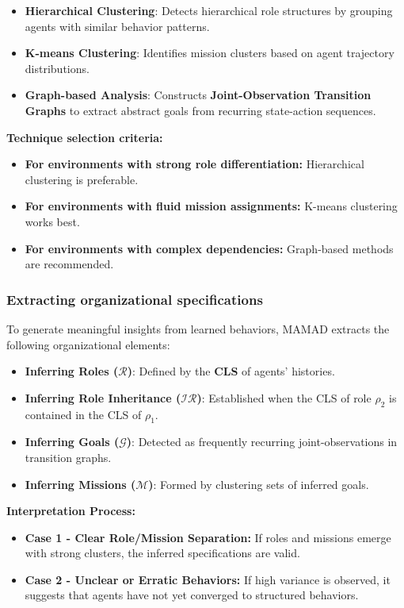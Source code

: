 \documentclass[pdflatex,sn-mathphys-num]{sn-jnl}%
\theoremstyle{thmstyleone}%
\theoremstyle{thmstyletwo}%
\theoremstyle{thmstylethree}%
\begin{document}
\begin{itemize}
    \item \textbf{Hierarchical Clustering}: Detects hierarchical role structures by grouping agents with similar behavior patterns.
    \item \textbf{K-means Clustering}: Identifies mission clusters based on agent trajectory distributions.
    \item \textbf{Graph-based Analysis}: Constructs \textbf{Joint-Observation Transition Graphs} to extract abstract goals from recurring state-action sequences.
\end{itemize}

\noindent \textbf{Technique selection criteria:}
\begin{itemize}
    \item \textbf{For environments with strong role differentiation:} Hierarchical clustering is preferable.
    \item \textbf{For environments with fluid mission assignments:} K-means clustering works best.
    \item \textbf{For environments with complex dependencies:} Graph-based methods are recommended.
\end{itemize}

\subsubsection{Extracting organizational specifications}
To generate meaningful insights from learned behaviors, MAMAD extracts the following organizational elements:

\begin{itemize}
    \item \textbf{Inferring Roles ($\mathcal{R}$)}: Defined by the \textbf{CLS} of agents' histories.
    \item \textbf{Inferring Role Inheritance ($\mathcal{IR}$)}: Established when the CLS of role $\rho_2$ is contained in the CLS of $\rho_1$.
    \item \textbf{Inferring Goals ($\mathcal{G}$)}: Detected as frequently recurring joint-observations in transition graphs.
    \item \textbf{Inferring Missions ($\mathcal{M}$)}: Formed by clustering sets of inferred goals.
\end{itemize}

\noindent \textbf{Interpretation Process:}
\begin{itemize}
    \item \textbf{Case 1 - Clear Role/Mission Separation:} If roles and missions emerge with strong clusters, the inferred specifications are valid.
    \item \textbf{Case 2 - Unclear or Erratic Behaviors:} If high variance is observed, it suggests that agents have not yet converged to structured behaviors.
\end{itemize}
\end{document}
